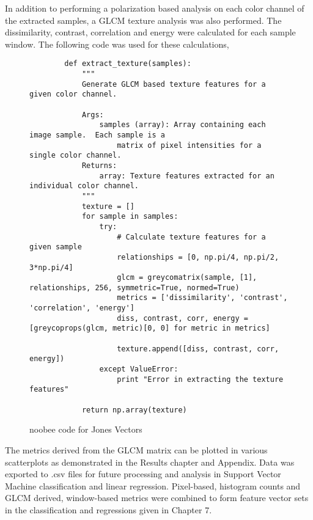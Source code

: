 In addition to performing a polarization based analysis on each color channel of the extracted samples, a GLCM texture analysis was also performed.  The dissimilarity, contrast, correlation and energy were calculated for each sample window.  The following code was used for these calculations,
\begin{figure}
    \begin{lstlisting}
        def extract_texture(samples):
            """
            Generate GLCM based texture features for a given color channel.

            Args:
                samples (array): Array containing each image sample.  Each sample is a
                    matrix of pixel intensities for a single color channel.
            Returns:
                array: Texture features extracted for an individual color channel.
            """
            texture = []
            for sample in samples:
                try:
                    # Calculate texture features for a given sample
                    relationships = [0, np.pi/4, np.pi/2, 3*np.pi/4]
                    glcm = greycomatrix(sample, [1], relationships, 256, symmetric=True, normed=True)
                    metrics = ['dissimilarity', 'contrast', 'correlation', 'energy']
                    diss, contrast, corr, energy = [greycoprops(glcm, metric)[0, 0] for metric in metrics]

                    texture.append([diss, contrast, corr, energy])
                except ValueError:
                    print "Error in extracting the texture features"

            return np.array(texture)
    \end{lstlisting}
    \caption{noobee code for Jones Vectors}
    \label{fig:scattering}
\end{figure}
The metrics derived from the GLCM matrix can be plotted in various scatterplots as demonstrated in the Results chapter and Appendix. Data was exported to .csv files for future processing and analysis in Support Vector Machine classification and linear regression.
Pixel-based, histogram counts and GLCM derived, window-based metrics were combined to form feature vector sets in the classification and regressions given in Chapter 7.
